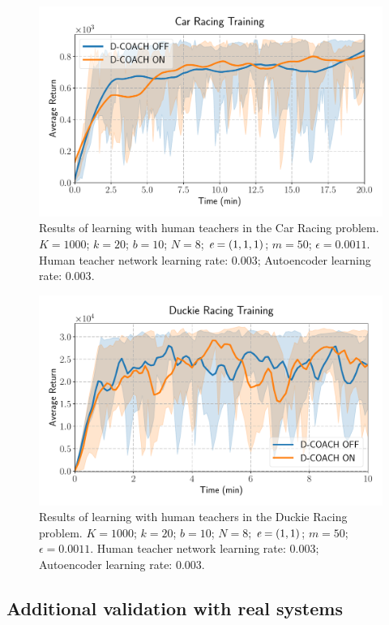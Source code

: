 \begin{figure}[H]
    \centering
    \includegraphics[width=0.7\linewidth]{imagenes/cap3/car_racing_human_teacher_ICRA.pdf}
    \caption[Results of learning with human teachers in the Car Racing problem.]{Results of learning with human teachers in the Car Racing problem. $K = 1000$; $k=20$; $b = 10$; $N = 8$; $\emph{e}=(1, 1, 1)$; $m=50$; $\epsilon=0.0011$. Human teacher network learning rate: $0.003$; Autoencoder learning rate: $0.003$.}
    \label{fig:humanteachers1}
\end{figure}

\begin{figure}[H]
    \centering
    \includegraphics[width=0.7\linewidth]{imagenes/cap3/duckie_human_teacher_ICRA.pdf}
    \caption[Results of learning with human teachers in the Duckie Racing problem.]{Results of learning with human teachers in the Duckie Racing problem. $K = 1000$; $k=20$; $b = 10$; $N = 8$; $\emph{e}=(1, 1)$; $m=50$; $\epsilon=0.0011$. Human teacher network learning rate: $0.003$; Autoencoder learning rate: $0.003$.}
    \label{fig:humanteachers2}
\end{figure}

\subsection{Additional validation with real systems}

